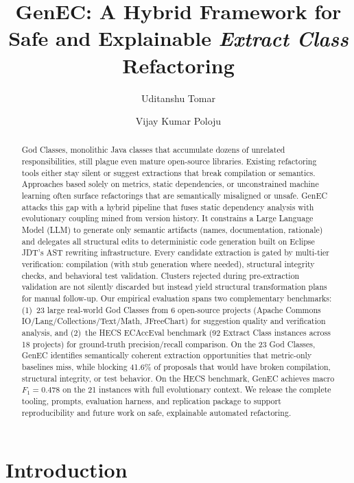\documentclass[sigconf]{acmart}
\title{GenEC: A Hybrid Framework for Safe and Explainable \emph{Extract Class} Refactoring}
\author{Uditanshu Tomar}
\affiliation{%
  \institution{University of Colorado Boulder}
  \city{Boulder}
  \state{CO}
  \country{USA}}
\author{Vijay Kumar Poloju}
\affiliation{%
  \institution{University of Colorado Boulder}
  \city{Boulder}
  \state{CO}
  \country{USA}}
\begin{document}
\begin{abstract}
God Classes, monolithic Java classes that accumulate dozens of unrelated
responsibilities, still plague even mature open-source libraries. Existing
refactoring tools either stay silent or suggest extractions that break
compilation or semantics. Approaches based solely on metrics, static
dependencies, or unconstrained machine learning often surface refactorings that
are semantically misaligned or unsafe. GenEC attacks this gap with a hybrid
pipeline that fuses static dependency analysis with evolutionary coupling mined
from version history. It constrains a Large Language Model (LLM) to generate
only semantic artifacts (names, documentation, rationale) and delegates all
structural edits to deterministic code generation built on Eclipse JDT's AST rewriting infrastructure. Every
candidate extraction is gated by multi-tier verification: compilation (with stub
generation where needed), structural integrity checks, and behavioral test
validation. Clusters rejected during pre-extraction validation are not silently discarded but
instead yield structural transformation plans for manual follow-up. Our empirical evaluation spans two
complementary benchmarks: (1)~23 large real-world God Classes from 6
open-source projects (Apache Commons IO/Lang/Collections/Text/Math, JFreeChart)
for suggestion quality and verification analysis, and (2)~the HECS ECAccEval
benchmark (92 Extract Class instances across 18 projects) for ground-truth
precision/recall comparison. On the 23 God Classes, GenEC identifies
semantically coherent extraction opportunities that metric-only baselines miss,
while blocking 41.6\% of proposals that would have broken compilation,
structural integrity, or test behavior. On the HECS benchmark, GenEC achieves macro $F_1=0.478$ on the 21
instances with full evolutionary context. We release the complete tooling,
prompts, evaluation harness, and replication package to support reproducibility
and future work on safe, explainable automated refactoring.
\end{abstract}

\maketitle

\section{Introduction}
\label{sec:intro}
\end{document}

